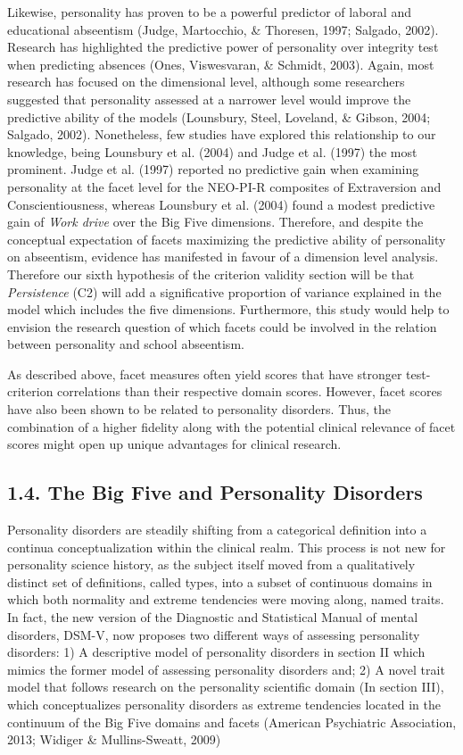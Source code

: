 \documentclass[,man,floatsintext]{apa6}
\theoremstyle{definition}
\theoremstyle{definition}
\theoremstyle{definition}
\theoremstyle{remark}
\begin{document}
Likewise, personality has proven to be a powerful predictor of laboral
and educational abseentism (Judge, Martocchio, \& Thoresen, 1997;
Salgado, 2002). Research has highlighted the predictive power of
personality over integrity test when predicting absences (Ones,
Viswesvaran, \& Schmidt, 2003). Again, most research has focused on the
dimensional level, although some researchers suggested that personality
assessed at a narrower level would improve the predictive ability of the
models (Lounsbury, Steel, Loveland, \& Gibson, 2004; Salgado, 2002).
Nonetheless, few studies have explored this relationship to our
knowledge, being Lounsbury et al. (2004) and Judge et al. (1997) the
most prominent. Judge et al. (1997) reported no predictive gain when
examining personality at the facet level for the NEO-PI-R composites of
Extraversion and Conscientiousness, whereas Lounsbury et al. (2004)
found a modest predictive gain of \emph{Work drive} over the Big Five
dimensions. Therefore, and despite the conceptual expectation of facets
maximizing the predictive ability of personality on abseentism, evidence
has manifested in favour of a dimension level analysis. Therefore our
sixth hypothesis of the criterion validity section will be that
\emph{Persistence} (C2) will add a significative proportion of variance
explained in the model which includes the five dimensions. Furthermore,
this study would help to envision the research question of which facets
could be involved in the relation between personality and school
abseentism.

As described above, facet measures often yield scores that have stronger
test-criterion correlations than their respective domain scores.
However, facet scores have also been shown to be related to personality
disorders. Thus, the combination of a higher fidelity along with the
potential clinical relevance of facet scores might open up unique
advantages for clinical research.

\hypertarget{the-big-five-and-personality-disorders}{%
\subsection{1.4. The Big Five and Personality
Disorders}\label{the-big-five-and-personality-disorders}}

Personality disorders are steadily shifting from a categorical
definition into a continua conceptualization within the clinical realm.
This process is not new for personality science history, as the subject
itself moved from a qualitatively distinct set of definitions, called
types, into a subset of continuous domains in which both normality and
extreme tendencies were moving along, named traits. In fact, the new
version of the Diagnostic and Statistical Manual of mental disorders,
DSM-V, now proposes two different ways of assessing personality
disorders: 1) A descriptive model of personality disorders in section II
which mimics the former model of assessing personality disorders and; 2)
A novel trait model that follows research on the personality scientific
domain (In section III), which conceptualizes personality disorders as
extreme tendencies located in the continuum of the Big Five domains and
facets (American Psychiatric Association, 2013; Widiger \&
Mullins-Sweatt, 2009)
\end{document}
